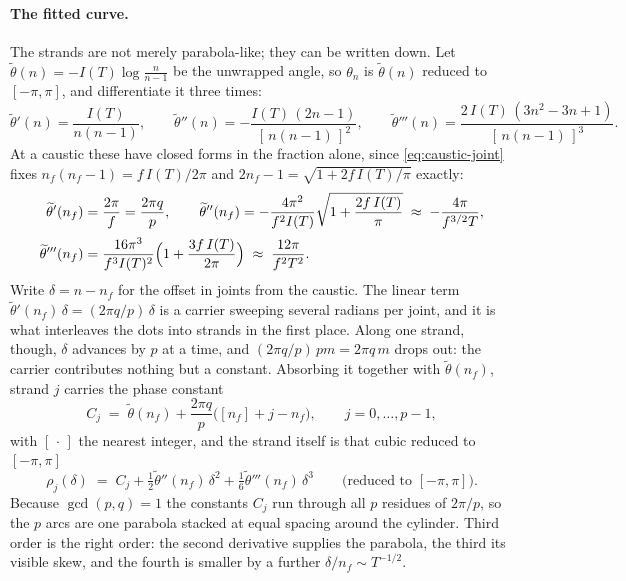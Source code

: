 \documentclass[11pt]{article}
\theoremstyle{definition}
\begin{document}
\paragraph{The fitted curve.} The strands are not merely parabola-like; they can
be written down. Let $\widetilde\theta(n)=-I(T)\log\frac{n}{n-1}$ be the
unwrapped angle, so $\theta_n$ is $\widetilde\theta(n)$ reduced to
$[-\pi,\pi]$, and
differentiate it three times:
\begin{equation}\label{eq:jangle-derivs}
\widetilde\theta'(n)=\frac{I(T)}{n(n-1)},\qquad
\widetilde\theta''(n)=-\frac{I(T)\,(2n-1)}{[\,n(n-1)\,]^{2}},\qquad
\widetilde\theta'''(n)=\frac{2\,I(T)\,(3n^{2}-3n+1)}{[\,n(n-1)\,]^{3}}.
\end{equation}
At a caustic these have closed forms in the fraction alone, since
\eqref{eq:caustic-joint} fixes $n_f(n_f-1)=f\,I(T)/2\pi$ and
$2n_f-1=\sqrt{1+2f\,I(T)/\pi}$ exactly:
\begin{equation}\label{eq:caustic-derivs}
\begin{aligned}
\widetilde\theta'(n_f)&=\frac{2\pi}{f}=\frac{2\pi q}{p},
\qquad
\widetilde\theta''(n_f)=-\frac{4\pi^{2}}{f^{2}I(T)}
\sqrt{1+\frac{2f\,I(T)}{\pi}}\;\approx\;-\frac{4\pi}{f^{3/2}T},\\[2pt]
\widetilde\theta'''(n_f)&=\frac{16\pi^{3}}{f^{3}I(T)^{2}}
\Bigl(1+\frac{3f\,I(T)}{2\pi}\Bigr)\;\approx\;\frac{12\pi}{f^{2}T^{2}}.
\end{aligned}
\end{equation}
Write $\delta=n-n_f$ for the offset in joints from the caustic. The linear term
$\widetilde\theta'(n_f)\,\delta=(2\pi q/p)\,\delta$ is a carrier sweeping several
radians per joint, and it is what interleaves the dots into strands in the first
place. Along one strand, though, $\delta$ advances by $p$ at a time, and
$(2\pi q/p)\,pm=2\pi q\,m$ drops out: the carrier contributes nothing but a
constant. Absorbing it together with $\widetilde\theta(n_f)$, strand $j$ carries
the phase constant
\begin{equation}\label{eq:caustic-Cj}
C_j\;=\;\widetilde\theta(n_f)+\frac{2\pi q}{p}\bigl([n_f]+j-n_f\bigr),
\qquad j=0,\dots,p-1,
\end{equation}
with $[\,\cdot\,]$ the nearest integer, and the strand itself is that cubic
reduced to $[-\pi,\pi]$
\begin{equation}\label{eq:fitted-arc}
\rho_j(\delta)\;=\; C_j
+\tfrac12\widetilde\theta''(n_f)\,\delta^{2}
+\tfrac16\widetilde\theta'''(n_f)\,\delta^{3}
\qquad\text{(reduced to $[-\pi,\pi]$)}.
\end{equation}
Because $\gcd(p,q)=1$ the constants $C_j$ run through all $p$ residues of
$2\pi/p$, so the $p$ arcs are one parabola stacked at equal spacing around the
cylinder. Third order is the right order: the second derivative supplies the
parabola, the third its visible skew, and the fourth is smaller by a further
$\delta/n_f\sim T^{-1/2}$.
\end{document}
